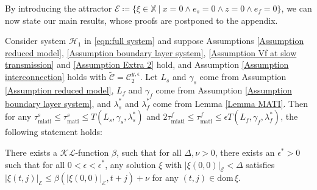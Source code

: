 %
%
By introducing the attractor $ \mathcal{E} \coloneqq \{ \xi \in \mathbb{X}\ | \ x=0 \wedge e_s = 0 \wedge z=0 \wedge e_f = 0 \}$, we can now state our main results, whose proofs are postponed to the appendix. 
\begin{thm}
Consider system $\mathcal{H}_1$ in \eqref{eqn:full system} and suppose Assumptions \ref{Assumption reduced model}, \ref{Assumption boundary layer system}, \ref{Assumption Vf at slow transmission} and \ref{Assumption Extra 2} hold, and Assumption \ref{Assumption interconnection} holds with $\widetilde {\mathcal{C}} = \mathcal{C}_2^{y,\epsilon}$. 
%
Let $L_s$ and $\gamma_s$ come from Assumption \ref{Assumption reduced model}, $L_f$ and $\gamma_f$ come from Assumption \ref{Assumption boundary layer system}, and $\lambda_s^*$ and $\lambda_f^*$ come from Lemma \ref{Lemma MATI}.
%
Then for any $\tau_{\text{miati}}^s \leq \tau_{\text{mati}}^s \leq T(L_s, \gamma_s, \lambda_s^*)$ and $2\tau_{\text{miati}}^f \leq \tau_{\text{mati}}^f \leq \epsilon T(L_f, \gamma_f,\lambda_f^*)$, the following statement holds:

There exists a $\mathcal{KL}$-function $\beta$, such that for all $\Delta, \nu > 0$, there exists an $\epsilon^* >0 $ such that for all $0<\epsilon<\epsilon^*$, any solution $\xi$ with $ |\xi(0,0)|_{\mathcal{E}}<\Delta$ satisfies $|\xi(t,j)|_\mathcal{E} \leq \beta(|\xi(0,0)|_\mathcal{E}, t+j) + \nu$ for any $(t,j)\in \text{dom} \, \xi$.
\label{Theorem H_1}
\end{thm}


